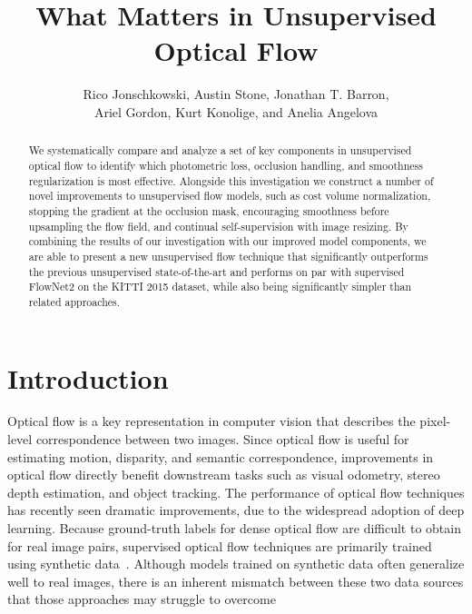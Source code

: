 \documentclass[runningheads]{llncs}
\begin{document}
\pagestyle{headings}
\mainmatter
\def\ECCVSubNumber{3651}  

\title{What Matters in Unsupervised Optical Flow}



\author{Rico Jonschkowski, Austin Stone, Jonathan T. Barron,\\Ariel Gordon, Kurt Konolige, and Anelia Angelova}

\maketitle


\begin{abstract}
We systematically compare and analyze a set of key components in unsupervised optical flow to identify which photometric loss, occlusion handling, and smoothness regularization is most effective. Alongside this investigation we construct a number of novel improvements to unsupervised flow models, such as cost volume normalization, stopping the gradient at the occlusion mask, encouraging smoothness before upsampling the flow field, and continual self-supervision with image resizing. By combining the results of our investigation with our improved model components, we are able to present a new unsupervised flow technique that significantly outperforms the previous unsupervised state-of-the-art and performs on par with supervised FlowNet2 on the KITTI 2015 dataset, while also being significantly simpler than related approaches.
\end{abstract}

\section{Introduction}

Optical flow is a key representation in computer vision that describes the pixel-level correspondence between two images. Since optical flow is useful for estimating motion, disparity, and semantic correspondence, improvements in optical flow directly benefit downstream tasks such as visual odometry, stereo depth estimation, and object tracking.
The performance of optical flow techniques has recently seen dramatic improvements, due to the widespread adoption of deep learning.
Because ground-truth labels for dense optical flow are difficult to obtain for real image pairs, supervised optical flow techniques are primarily trained using synthetic data~\cite{FlowNet}.
Although models trained on synthetic data often generalize well to real images, there is an inherent mismatch between these two data sources that those approaches may struggle to overcome~\cite{Mayer2018,datasetbias}
\end{document}
